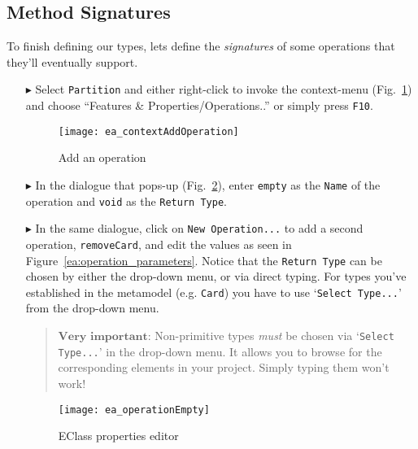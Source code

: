 \newpage
\subsection{Method Signatures}
\genHeader
\hypertarget{static:methods vis}{}

To finish defining our types, lets define the \emph{signatures} of some operations that they'll eventually support.

\begin{enumerate}

\item[$\blacktriangleright$] Select \texttt{Partition} and either right-click to invoke the context-menu (Fig.~\ref{ea:add_operation})  and choose ``Features \&
Properties/Operations..'' or simply press \texttt{F10}.

\begin{figure}[htbp]
	\centering
  \texttt{[image: ea\_contextAddOperation]}
	\caption{Add an operation}
	\label{ea:add_operation}
\end{figure}
\FloatBarrier

\item[$\blacktriangleright$] In the dialogue that pops-up (Fig.~\ref{ea:operation_properties}), enter \texttt{empty} as the \texttt{Name} of the operation and \texttt{void} as the \texttt{Return Type}.

\vspace{0.5cm}

\item[$\blacktriangleright$] In the same dialogue, click on \texttt{New Operation...} to add a second operation, \texttt{removeCard}, and edit the values as seen in 
Figure~\ref{ea:operation_parameters}. Notice that the \texttt{Return Type} can be chosen by either the drop-down menu, or via direct typing. For types you've established in
the metamodel (e.g. \texttt{Card}) you have to use `\texttt{Select Type...}' from the drop-down menu.
\vspace{-.3cm}
\begin{quote}
{ \small
$\textbf{Very important:}$ Non-primitive types \emph{must} be chosen via `\texttt{Select Type...}' in the drop-down menu. It allows you to browse for the corresponding elements in
your project. Simply typing them won't work!
}
\end{quote}

\begin{figure}[htbp]
	\centering
  	\texttt{[image: ea\_operationEmpty]}
	\caption{EClass properties editor}
	\label{ea:operation_properties}
\end{figure}



\end{enumerate}
